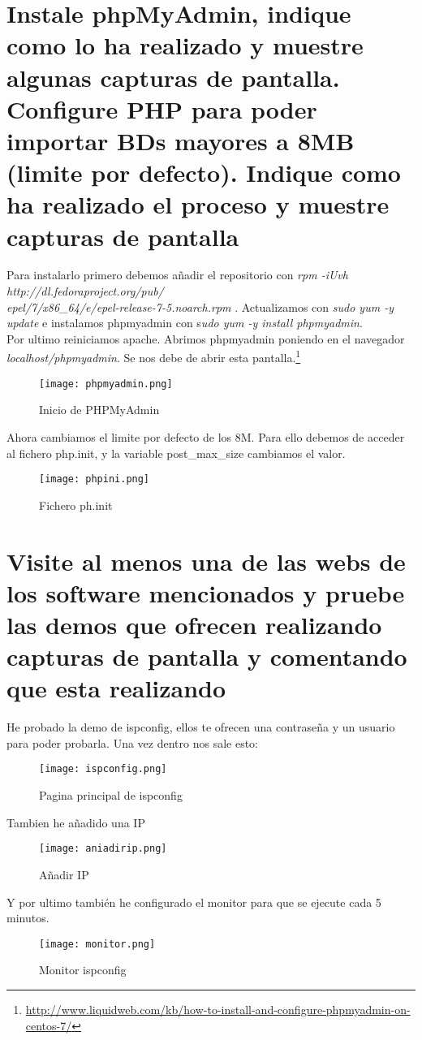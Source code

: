 \section{Instale phpMyAdmin, indique como lo ha realizado y muestre algunas capturas de pantalla. Configure PHP para poder importar BDs mayores a 8MB (limite por defecto). Indique como ha realizado el proceso y muestre capturas de pantalla}
Para instalarlo primero debemos añadir el repositorio con
\textit{rpm -iUvh http://dl.fedoraproject.org/pub/\\epel/7/x86\_64/e/epel-release-7-5.noarch.rpm
}. Actualizamos con \textit{sudo yum -y update} e instalamos phpmyadmin con s\textit{udo yum -y install phpmyadmin}.
\\Por ultimo reiniciamos apache.
Abrimos phpmyadmin poniendo en el navegador \textit{localhost/phpmyadmin}. Se nos debe de abrir esta pantalla.\footnote{\url{http://www.liquidweb.com/kb/how-to-install-and-configure-phpmyadmin-on-centos-7/}}
\begin{figure}[H] 
\centering
\texttt{[image: phpmyadmin.png]}  
\label{figura40:}
\caption{Inicio de PHPMyAdmin}
\end{figure}
Ahora cambiamos el limite por defecto de los 8M. Para ello debemos de acceder al fichero php.init, y la variable post\_max\_size cambiamos el valor.
\begin{figure}[H] 
\centering
\texttt{[image: phpini.png]}  
\label{figura41:}
\caption{Fichero ph.init}
\end{figure}
\section{Visite al menos una de las webs de los software mencionados y pruebe las demos que ofrecen realizando capturas de pantalla y comentando que esta realizando}
He probado la demo de ispconfig, ellos te ofrecen una contraseña y un usuario para poder probarla.
Una vez dentro nos sale esto:
\begin{figure}[H] 
\centering
\texttt{[image: ispconfig.png]}  
\label{figura42:}
\caption{Pagina principal de ispconfig}
\end{figure}
Tambien he añadido una IP
\begin{figure}[H] 
\centering
\texttt{[image: aniadirip.png]}  
\label{figura43:}
\caption{Añadir IP}
\end{figure}
Y por ultimo también he configurado el monitor para que se ejecute cada 5 minutos.
\begin{figure}[H] 
\centering
\texttt{[image: monitor.png]}  
\label{figura44:}
\caption{Monitor ispconfig}
\end{figure}

